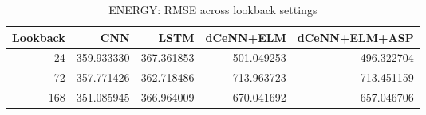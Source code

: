 \begin{table}
\caption{ENERGY: RMSE across lookback settings}
\begin{tabular}{rrrrr}
\toprule
Lookback & CNN & LSTM & dCeNN+ELM & dCeNN+ELM+ASP \\
\midrule
24 & 359.933330 & 367.361853 & 501.049253 & 496.322704 \\
72 & 357.771426 & 362.718486 & 713.963723 & 713.451159 \\
168 & 351.085945 & 366.964009 & 670.041692 & 657.046706 \\
\bottomrule
\end{tabular}
\end{table}
